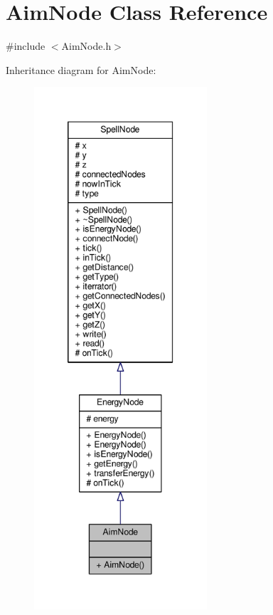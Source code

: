 \hypertarget{class_aim_node}{\section{Aim\-Node Class Reference}
\label{class_aim_node}
}


{\ttfamily \#include $<$Aim\-Node.\-h$>$}



Inheritance diagram for Aim\-Node\-:
\nopagebreak
\begin{figure}[H]
\begin{center}
\leavevmode
\includegraphics[height=550pt]{class_aim_node__inherit__graph}
\end{center}
\end{figure}


